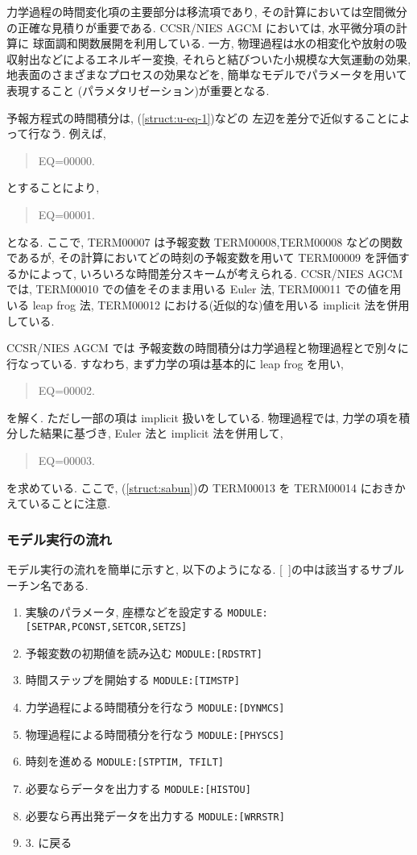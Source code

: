 力学過程の時間変化項の主要部分は移流項であり,
その計算においては空間微分の正確な見積りが重要である.
CCSR/NIES AGCM においては, 水平微分項の計算に
球面調和関数展開を利用している.
一方, 物理過程は水の相変化や放射の吸収射出などによるエネルギー変換, 
それらと結びついた小規模な大気運動の効果, 
地表面のさまざまなプロセスの効果などを, 
簡単なモデルでパラメータを用いて表現すること
(パラメタリゼーション)が重要となる.

予報方程式の時間積分は,
(\ref{struct:u-eq-1})などの
左辺を差分で近似することによって行なう. 例えば,
%
\begin{quote}
EQ=00000.
\end{quote}
%
とすることにより, 
\begin{quote}
EQ=00001.
\label{struct:sabun}
\end{quote}
となる. 
ここで, TERM00007 は予報変数 TERM00008,TERM00008 などの関数であるが,
その計算においてどの時刻の予報変数を用いて TERM00009 を評価するかによって,
いろいろな時間差分スキームが考えられる.
CCSR/NIES AGCM では, 
TERM00010 での値をそのまま用いる Euler 法,
TERM00011 での値を用いる leap frog 法, 
TERM00012 における(近似的な)値を用いる implicit 法を併用している.

CCSR/NIES AGCM では
予報変数の時間積分は力学過程と物理過程とで別々に行なっている.
すなわち, まず力学の項は基本的に leap frog を用い,
\begin{quote}
EQ=00002.
\end{quote}
を解く. ただし一部の項は implicit 扱いをしている.
物理過程では,
力学の項を積分した結果に基づき, 
Euler 法と implicit 法を併用して,
\begin{quote}
EQ=00003.
\end{quote}
を求めている. 
ここで, (\ref{struct:sabun})の TERM00013 を
TERM00014 におきかえていることに注意.

\subsubsection{モデル実行の流れ}

モデル実行の流れを簡単に示すと, 以下のようになる.
[\ ]の中は該当するサブルーチン名である.

\begin{enumerate}
\item 実験のパラメータ, 座標などを設定する \texttt{MODULE:[SETPAR,PCONST,SETCOR,SETZS]}
\item 予報変数の初期値を読み込む \texttt{MODULE:[RDSTRT]}
\item 時間ステップを開始する \texttt{MODULE:[TIMSTP]}
\item 力学過程による時間積分を行なう \texttt{MODULE:[DYNMCS]}
\item 物理過程による時間積分を行なう \texttt{MODULE:[PHYSCS]}
\item 時刻を進める \texttt{MODULE:[STPTIM, TFILT]}
\item 必要ならデータを出力する \texttt{MODULE:[HISTOU]}
\item 必要なら再出発データを出力する \texttt{MODULE:[WRRSTR]}
\item 3. に戻る
\end{enumerate}

